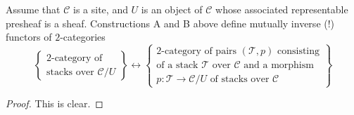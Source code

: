 \begin{lemma}
\label{lemma-localize-stacks}
Assume that $\mathcal{C}$ is a site,
and $U$ is an object of $\mathcal{C}$ whose associated representable
presheaf is a sheaf. Constructions A and B above define
mutually inverse (!) functors of $2$-categories
$$
\left\{
\begin{matrix}
2\text{-category of}\\
\text{stacks over }\mathcal{C}/U
\end{matrix}
\right\}
\leftrightarrow
\left\{
\begin{matrix}
2\text{-category of pairs }(\mathcal{T}, p)
\text{ consisting} \\
\text{of a stack }\mathcal{T}\text{ over }\mathcal{C}\text{ and a morphism} \\
p : \mathcal{T} \to \mathcal{C}/U\text{ of stacks over }\mathcal{C}
\end{matrix}
\right\}
$$
\end{lemma}

\begin{proof}
This is clear.
\end{proof}










